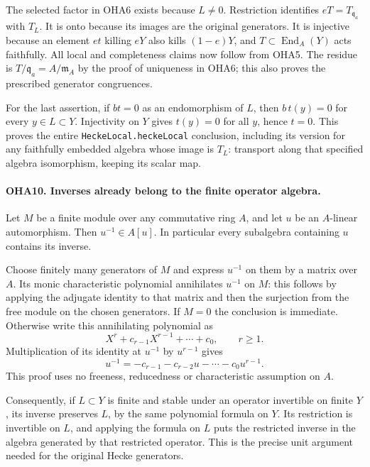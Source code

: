 \documentclass[11pt,a4paper]{article}
\numberwithin{equation}{section}
\theoremstyle{remark}\newtheorem{remark}[theorem]{Remark}
\begin{document}
The selected factor in OHA6 exists because \(L\ne0\).
Restriction identifies \(eT=T_{\mathfrak q_a}\) with \(T_L\).
It is onto because its images are the original generators.
It is injective because an element \(et\) killing \(eY\)
also kills \((1-e)Y\), and \(T\subset\operatorname{End}_A(Y)\)
acts faithfully. All local and completeness claims now follow
from OHA5. The residue is \(T/\mathfrak q_a=A/\mathfrak m_A\)
by the proof of uniqueness in OHA6; this also proves the
prescribed generator congruences.

For the last assertion, if \(bt=0\) as an endomorphism of \(L\),
then \(b\,\allowbreak{} t(y)=0\) for every \(y\in L\subset Y\).
Injectivity on \(Y\) gives \(t(y)=0\) for all \(y\), hence \(t=0\).
This proves the entire \texttt{Hecke\allowbreak Local.\allowbreak hecke\allowbreak Local} conclusion,
including its version for any faithfully embedded algebra whose
image is \(T_L\): transport along that specified algebra
isomorphism, keeping its scalar map.

\paragraph{OHA10. Inverses already belong to the finite operator algebra.}
\label{claim:OHA10}
Let \(M\) be a finite module over any commutative ring \(A\),
and let \(u\) be an \(A\)-linear automorphism. Then
\(u^{-1}\in A[u]\). In particular every subalgebra containing
\(u\) contains its inverse.

Choose finitely many generators of \(M\) and express \(u^{-1}\)
on them by a matrix over \(A\). Its monic characteristic
polynomial annihilates \(u^{-1}\) on \(M\): this follows by
applying the adjugate identity to that matrix and then the
surjection from the free module on the chosen generators.
If \(M=0\) the conclusion is immediate. Otherwise write this
annihilating polynomial as
\[
                    X^r+c_{r-1}X^{r-1}+\cdots+c_0,\qquad r\ge1 .
\]
Multiplication of its identity at \(u^{-1}\) by \(u^{r-1}\)
gives
\[
            u^{-1}=-c_{r-1}-c_{r-2}u-\cdots-c_0u^{r-1}.
\]
This proof uses no freeness, reducedness or characteristic
assumption on \(A\).

Consequently, if \(L\subset Y\) is finite and stable under
an operator invertible on finite \(Y\), its inverse preserves
\(L\), by the same polynomial formula on \(Y\).
Its restriction is invertible on \(L\), and applying the formula
on \(L\) puts the restricted inverse in the algebra generated
by that restricted operator. This is the precise unit argument
needed for the original Hecke generators.
\end{document}
